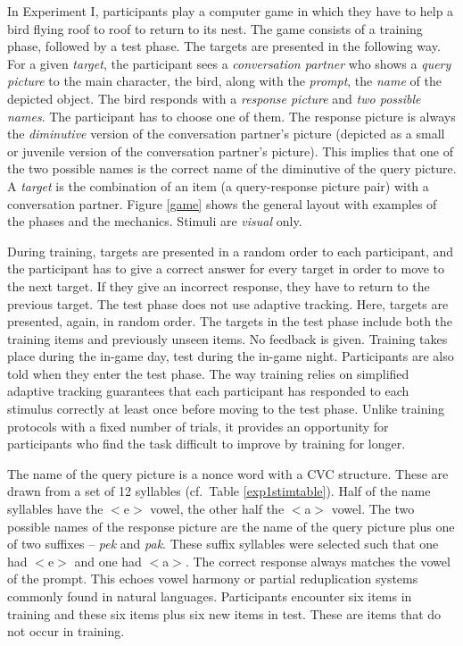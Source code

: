 \documentclass{frontiersSCNS} %
\begin{document}
In Experiment I, participants play a computer game in which they have to help a bird flying roof to roof to return to its nest.
The game consists of a training phase, followed by a test phase. The targets are presented in the following way. For a given
\emph{target}, the participant sees a \emph{conversation partner} who shows a \emph{query picture} to the main character, the bird, along
with the \emph{prompt}, the \emph{name} of the depicted object.  The bird responds with a \emph{response picture} and \emph{two
possible names}. The participant has to choose one of them. The response picture is always the \emph{diminutive} version of the
conversation partner's picture (depicted as a small or juvenile version of the conversation partner's picture).
This implies that one of the two possible names is the correct name of the diminutive of the query
picture. A \emph{target} is the combination of an item (a query-response picture pair) with a conversation partner. Figure \ref{game}
shows the general layout with examples of the phases and the mechanics. Stimuli are \emph{visual} only.

During training, targets are presented in a random order to each participant, and the participant has to give a correct
answer for every target in order to move to the next target. If they give an incorrect response, they have to return to the
previous target. The test phase does not use
adaptive tracking. Here, targets are presented, again, in random order. The targets in the test phase include both the
training items and previously unseen items.  No feedback is given. Training takes place during the
in-game day, test during the in-game night. Participants are also told when they enter the test phase. The way training relies on
simplified adaptive tracking guarantees that each participant has responded to each stimulus correctly at least once before moving to the test phase. Unlike training protocols with a fixed number of trials, it provides an opportunity for participants who find the task difficult
to improve by training for longer.  

The name of the query picture is a nonce word with a CVC structure. These are drawn from a set of 12 syllables (cf.\ Table \ref{exp1stimtable}).  Half of the name syllables have the $<$e$>$ vowel, the other half the $<$a$>$ vowel. The two possible names of the response picture are the name of the query picture plus one of two suffixes -- \emph{pek} and \emph{pak}.  These suffix syllables were selected such that one had $<$e$>$ and one had $<$a$>$. The correct response always matches the vowel of the prompt. This echoes vowel harmony or partial reduplication systems commonly found in natural languages. Participants encounter six items in training and these six items plus six new items in test. These are items that do not occur in training.
\end{document}
